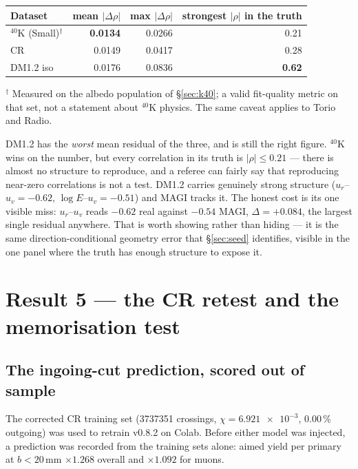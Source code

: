 \documentclass[11pt,a4paper]{article}
\begin{document}
\begin{center}
\begin{tabular}{lrrr}
\toprule
Dataset & mean $|\Delta\rho|$ & max $|\Delta\rho|$ & strongest $|\rho|$ in the truth \\
\midrule
$^{40}$K (Small)$^{\dagger}$ & \textbf{0.0134} & 0.0266 & 0.21 \\
CR               & 0.0149 & 0.0417 & 0.28 \\
DM1.2 iso        & 0.0176 & 0.0836 & \textbf{0.62} \\
\bottomrule
\end{tabular}

{\footnotesize $^{\dagger}$ Measured on the albedo population of
\S\ref{sec:k40}; a valid fit-quality metric on that set, not a statement about
$^{40}$K physics. The same caveat applies to Torio and Radio.}
\end{center}

\noindent DM1.2 has the \emph{worst} mean residual of the three, and is still
the right figure. $^{40}$K wins on the number, but every correlation in its truth is
$|\rho| \le 0.21$ --- there is almost no structure to reproduce, and a referee
can fairly say that reproducing near-zero correlations is not a test. DM1.2
carries genuinely strong structure ($u_r$--$u_v = -0.62$,
$\log E$--$u_v = -0.51$) and MAGI tracks it. The honest cost is its one visible
miss: $u_r$--$u_v$ reads $-0.62$ real against $-0.54$ MAGI,
$\Delta = +0.084$, the largest single residual anywhere. That is worth showing
rather than hiding --- it is the same direction-conditional geometry error that
\S\ref{sec:seed} identifies, visible in the one panel where the truth has enough
structure to expose it.


\section{Result 5 --- the CR retest and the memorisation test}
\label{sec:retest}

\subsection{The ingoing-cut prediction, scored out of sample}

The corrected CR training set (\num{3737351} crossings, $\chi=\num{6.921e-3}$,
$0.00\,\%$ outgoing) was used to retrain v0.8.2 on Colab. Before either model was
injected, a prediction was recorded from the training sets alone: aimed yield per
primary at $b<20$\,mm $\times 1.268$ overall and $\times 1.092$ for muons.
\end{document}
